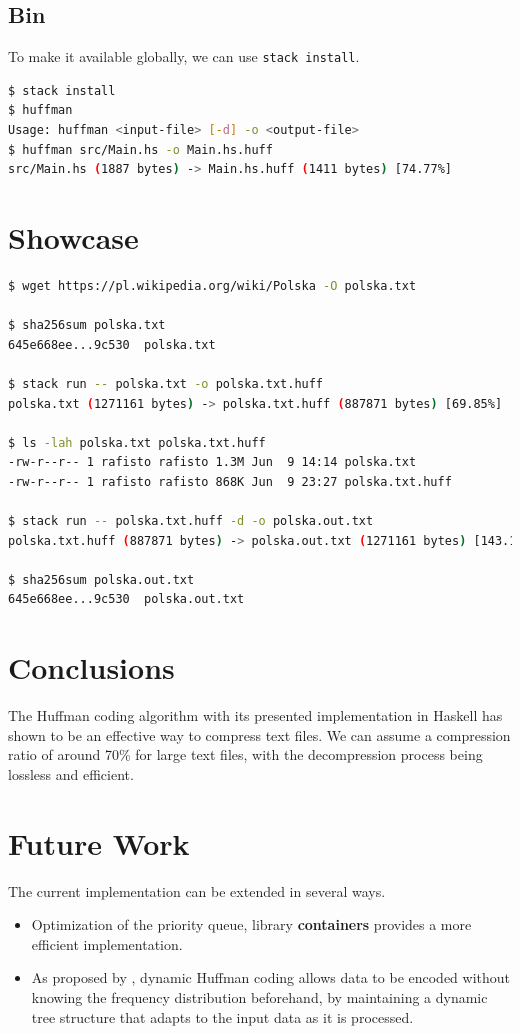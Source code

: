 \documentclass{article}
\begin{document}
\subsection{Bin}

To make it available globally, we can use \texttt{stack install}. 

\begin{lstlisting}[language=bash]
$ stack install
$ huffman
Usage: huffman <input-file> [-d] -o <output-file>
$ huffman src/Main.hs -o Main.hs.huff
src/Main.hs (1887 bytes) -> Main.hs.huff (1411 bytes) [74.77%]
\end{lstlisting}

\section{Showcase}

\begin{lstlisting}[language=bash]
$ wget https://pl.wikipedia.org/wiki/Polska -O polska.txt

$ sha256sum polska.txt
645e668ee...9c530  polska.txt

$ stack run -- polska.txt -o polska.txt.huff
polska.txt (1271161 bytes) -> polska.txt.huff (887871 bytes) [69.85%]

$ ls -lah polska.txt polska.txt.huff
-rw-r--r-- 1 rafisto rafisto 1.3M Jun  9 14:14 polska.txt
-rw-r--r-- 1 rafisto rafisto 868K Jun  9 23:27 polska.txt.huff

$ stack run -- polska.txt.huff -d -o polska.out.txt
polska.txt.huff (887871 bytes) -> polska.out.txt (1271161 bytes) [143.17%]

$ sha256sum polska.out.txt 
645e668ee...9c530  polska.out.txt
\end{lstlisting}

\section{Conclusions}

The Huffman coding algorithm with its presented implementation in Haskell has shown to be an effective way to compress text files.
We can assume a compression ratio of around 70\% for large text files, with the decompression process being lossless and efficient.

\section{Future Work}

The current implementation can be extended in several ways.
\begin{itemize}
    \item Optimization of the priority queue, library \textbf{containers} provides a more efficient implementation.
    \item As proposed by \cite{knuth1985dynamic}, dynamic Huffman coding allows data to be encoded without knowing the frequency distribution beforehand,
by maintaining a dynamic tree structure that adapts to the input data as it is processed.
\end{itemize}



\end{document}
